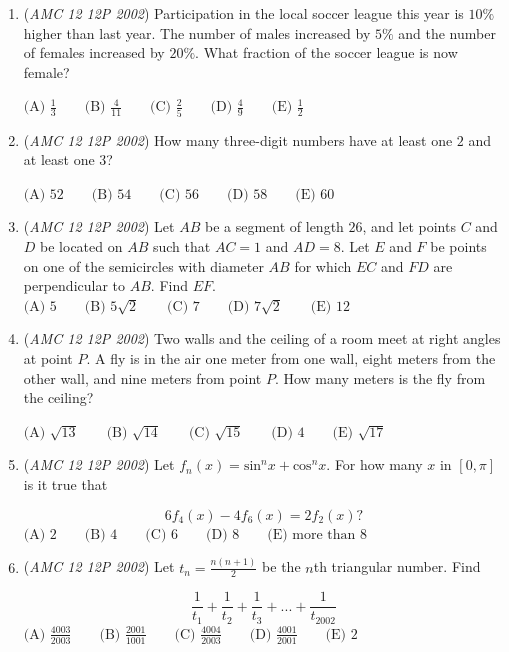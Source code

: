 \begin{enumerate}
	\item (\textit{AMC 12 12P 2002}) Participation in the local soccer league this year is $10\%$ higher than last year. The number of males increased by $5\%$ and the number of females increased by $20\%$. What fraction of the soccer league is now female?


 $\text{(A) }\frac{1}{3} \qquad \text{(B) }\frac{4}{11} \qquad \text{(C) }\frac{2}{5} \qquad \text{(D) }\frac{4}{9} \qquad \text{(E) }\frac{1}{2}$


	\item (\textit{AMC 12 12P 2002}) How many three-digit numbers have at least one $2$ and at least one $3$?


 $\text{(A) }52 \qquad \text{(B) }54  \qquad \text{(C) }56 \qquad \text{(D) }58 \qquad \text{(E) }60$


	\item (\textit{AMC 12 12P 2002}) Let $AB$ be a segment of length $26$, and let points $C$ and $D$ be located on $AB$ such that $AC=1$ and $AD=8$. Let $E$ and $F$ be points on one of the semicircles with diameter $AB$ for which $EC$ and $FD$ are perpendicular to $AB$. Find $EF.$
$\text{(A) }5 \qquad \text{(B) }5 \sqrt{2}  \qquad \text{(C) }7 \qquad \text{(D) }7 \sqrt{2} \qquad \text{(E) }12$


	\item (\textit{AMC 12 12P 2002}) Two walls and the ceiling of a room meet at right angles at point $P.$  A fly is in the air one meter from one wall, eight meters from the other wall, and nine meters from point $P$. How many meters is the fly from the ceiling?


 $\text{(A) }\sqrt{13} \qquad \text{(B) }\sqrt{14} \qquad \text{(C) }\sqrt{15} \qquad \text{(D) }4 \qquad \text{(E) }\sqrt{17}$


	\item (\textit{AMC 12 12P 2002}) Let $f_n (x) = \text{sin}^n x + \text{cos}^n x.$ For how many $x$ in $[0,\pi]$ is it true that


 
 \[6f_{4}(x)-4f_{6}(x)=2f_{2}(x)?\]
$\text{(A) }2 \qquad \text{(B) }4  \qquad \text{(C) }6 \qquad \text{(D) }8 \qquad \text{(E) more than }8$


	\item (\textit{AMC 12 12P 2002}) Let $t_n = \frac{n(n+1)}{2}$ be the $n$th triangular number. Find


 
 \[\frac{1}{t_1} + \frac{1}{t_2} + \frac{1}{t_3} + ... + \frac{1}{t_{2002}}\]
$\text{(A) }\frac {4003}{2003} \qquad \text{(B) }\frac {2001}{1001} \qquad \text{(C) }\frac {4004}{2003} \qquad \text{(D) }\frac {4001}{2001} \qquad \text{(E) }2$



\end{enumerate}
